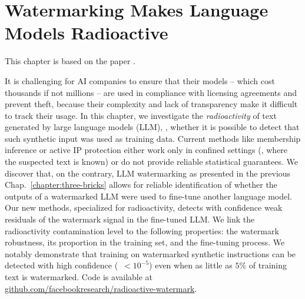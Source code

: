 
\chapter{Watermarking Makes Language Models Radioactive}\label{chapter:radioactive}


This chapter is based on the paper .

It is challenging for AI companies to ensure that their models -- which cost thousands if not millions -- are used in compliance with licensing agreements and prevent theft, because their complexity and lack of transparency make it difficult to track their usage. 
In this chapter, we investigate the \emph{radioactivity} of text generated by large language models (LLM), \ie,  whether it is possible to detect that such synthetic input was used as training data.
Current methods like membership inference or active IP protection either work only in confined settings (\eg, where the suspected text is known) or do not provide reliable statistical guarantees.
We discover that, on the contrary, LLM watermarking as presented in the previous Chap.~\ref{chapter:three-bricks} allows for reliable identification of whether the outputs of a watermarked LLM were used to fine-tune another language model.
Our new methods, specialized for radioactivity, detects with confidence weak residuals of the watermark signal in the fine-tuned LLM.
We link the radioactivity contamination level to the following properties: the watermark robustness, its proportion in the training set, and the fine-tuning process.
We notably demonstrate that training on watermarked synthetic instructions can be detected with high confidence (\pval\ $< 10^{-5}$) even when as little as $5\%$ of training text is watermarked.
Code is available at \url{github.com/facebookresearch/radioactive-watermark}.

\newpage









